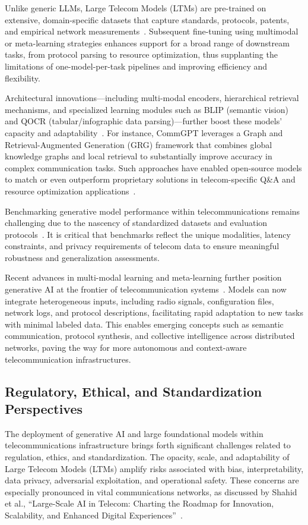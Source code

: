 \documentclass[sigconf]{acmart}
\begin{document}
Unlike generic LLMs, Large Telecom Models (LTMs) are pre-trained on extensive, domain-specific datasets that capture standards, protocols, patents, and empirical network measurements~\cite{ref26,ref33}. Subsequent fine-tuning using multimodal or meta-learning strategies enhances support for a broad range of downstream tasks, from protocol parsing to resource optimization, thus supplanting the limitations of one-model-per-task pipelines and improving efficiency and flexibility.

Architectural innovations—including multi-modal encoders, hierarchical retrieval mechanisms, and specialized learning modules such as BLIP (semantic vision) and QOCR (tabular/infographic data parsing)—further boost these models' capacity and adaptability~\cite{ref21}. For instance, CommGPT leverages a Graph and Retrieval-Augmented Generation (GRG) framework that combines global knowledge graphs and local retrieval to substantially improve accuracy in complex communication tasks. Such approaches have enabled open-source models to match or even outperform proprietary solutions in telecom-specific Q\&A and resource optimization applications~\cite{ref21,ref26}.

Benchmarking generative model performance within telecommunications remains challenging due to the nascency of standardized datasets and evaluation protocols~\cite{ref7,ref13,ref21,ref26,ref33,ref44}. It is critical that benchmarks reflect the unique modalities, latency constraints, and privacy requirements of telecom data to ensure meaningful robustness and generalization assessments.

Recent advances in multi-modal learning and meta-learning further position generative AI at the frontier of telecommunication systems~\cite{ref44}. Models can now integrate heterogeneous inputs, including radio signals, configuration files, network logs, and protocol descriptions, facilitating rapid adaptation to new tasks with minimal labeled data. This enables emerging concepts such as semantic communication, protocol synthesis, and collective intelligence across distributed networks, paving the way for more autonomous and context-aware telecommunication infrastructures.

\subsection{Regulatory, Ethical, and Standardization Perspectives}

The deployment of generative AI and large foundational models within telecommunications infrastructure brings forth significant challenges related to regulation, ethics, and standardization. The opacity, scale, and adaptability of Large Telecom Models (LTMs) amplify risks associated with bias, interpretability, data privacy, adversarial exploitation, and operational safety. These concerns are especially pronounced in vital communications networks, as discussed by Shahid et al., ``Large-Scale AI in Telecom: Charting the Roadmap for Innovation, Scalability, and Enhanced Digital Experiences''~\cite{ref33}.
\end{document}
